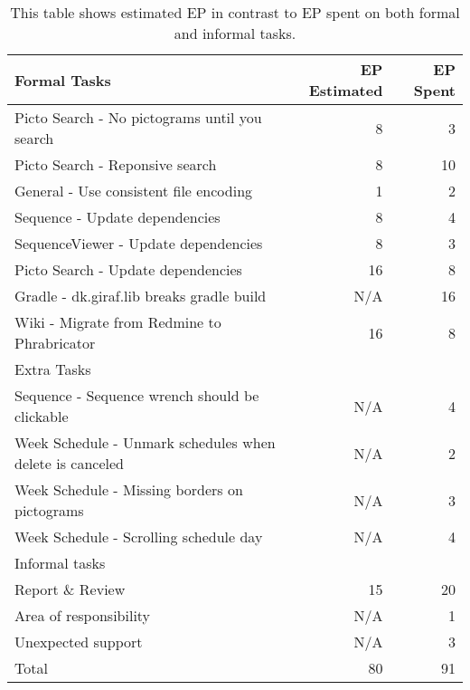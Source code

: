 \begin{table}[h]
    {\setlength{\extrarowheight}{1ex}%
    \begin{tabularx}{\textwidth}{X|r|r}
        \toprule
        Formal Tasks                                                  & EP Estimated & EP Spent     \\
        \midrule
        Picto Search - No pictograms until you search                 & 8            & 3            \\
        Picto Search - Reponsive search                               & 8            & 10           \\
        General - Use consistent file encoding                        & 1            & 2            \\
        Sequence - Update dependencies                                & 8            & 4            \\
        SequenceViewer - Update dependencies                          & 8            & 3            \\
        Picto Search - Update dependencies                            & 16           & 8            \\
        Gradle - dk.giraf.lib breaks gradle build                     & N/A          & 16           \\
        Wiki - Migrate from Redmine to Phrabricator                   & 16           & 8            \\
        \toprule
        Extra Tasks                                                   &              &              \\
        \midrule
        Sequence - Sequence wrench should be clickable                & N/A          & 4            \\
        Week Schedule - Unmark schedules when delete is canceled       & N/A          & 2            \\
        Week Schedule - Missing borders on pictograms                 & N/A          & 3            \\
        Week Schedule - Scrolling schedule day                        & N/A          & 4            \\
        \toprule
        Informal tasks                                                &              &              \\
        \midrule
        Report \& Review                                              & 15           & 20           \\      %
        Area of responsibility                                        & N/A          & 1            \\
        Unexpected support                                            & N/A          & 3            \\
        \midrule
        Total                                                         & 80           & 91           \\
        \bottomrule
    \end{tabularx}}
    \caption{This table shows estimated EP in contrast to EP spent on both formal and informal tasks.}
    \label{tab:sprint1tasktable}
\end{table}
